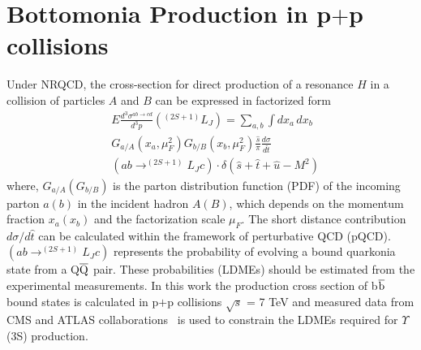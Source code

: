 \documentclass[twocolumn,amsmath,amssymb]{snp}
\begin{document}
\section*{Bottomonia Production in p$+$p collisions}
Under NRQCD, the cross-section for direct production of a resonance $H$ in 
a collision of particles $A$ and $B$ can be expressed in factorized form 
\begin{equation}
  \begin{split}
    &E\frac{d^{3}\sigma^{ab\rightarrow cd}}{d^{3}p}(^{(2S+1)}L_{J}) = \sum_{a,b}\int dx_a\,dx_b \\
    &G_{a/A}(x_a,\mu_{F}^{2}) G_{b/B}(x_b,\mu_{F}^{2})\frac{\hat s}{\pi}\frac{d\sigma}{d\hat t}\\
    &(ab\rightarrow^{(2S+1)}L_{J}c)\cdot \delta(\hat s + \hat t + \hat u -M^{2}) \nonumber
\end{split}
\end{equation}
where, $G_{a/A}(G_{b/B})$ is the parton distribution function (PDF) of the incoming parton $a(b)$ in the 
incident hadron $A(B)$, which depends on the momentum fraction $x_a(x_b)$ and the factorization 
scale $\mu_F$. The short distance contribution $d\sigma/d\hat t$ can be calculated 
within the framework of perturbative QCD (pQCD). $(ab\rightarrow^{(2S+1)}L_{J}c)$ 
represents the probability of evolving a bound quarkonia state from a Q$\overline{\rm Q}$
pair. These probabilities (LDMEs) should be estimated from the experimental measurements. 
In this work the production cross section of b$\overline{\rm b}$ bound states is calculated 
in p$+$p collisions $\sqrt{s}$ = 7 TeV and measured data from CMS and ATLAS 
collaborations~\cite{Khachatryan:2015qpa,Aad:2012dlq} is used to constrain the LDMEs required for
$\Upsilon$(3S) production.
\end{document}
